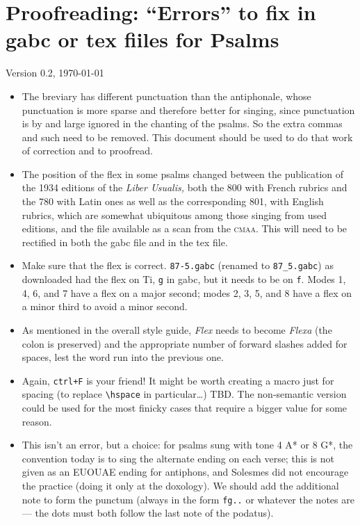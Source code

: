 \documentclass[11pt]{article}
\begin{document}
 \section{Proofreading: ``Errors'' to fix in gabc or tex fiiles for Psalms}
 
 {\centering Version 0.2, \today\par}
 
\begin{itemize}
 \item
The breviary has different punctuation than the antiphonale, whose punctuation is more sparse and therefore better for singing, since punctuation is by and large ignored in the chanting of the psalms. So the extra commas and such need to be removed. This document should be used to do that work of correction and to proofread.
 
 \item
 The position of the flex in some psalms changed between the publication of the 1934 editions of the \textit{Liber Usualis,} both the 800 with French rubrics and the 780 with Latin ones as well as the corresponding 801, with English rubrics, which are somewhat ubiquitous among those singing from used editions, and the file available as a scan from the \textsc{cmaa}. This will need to be rectified in both the gabc file and in the tex file.
 
 \item
 
 Make sure that the flex is correct. \verb|87-5.gabc| (renamed to \verb|87_5.gabc|) as downloaded had the flex on Ti, \verb|g| in gabc, but it needs to be on \verb|f|. Modes 1, 4, 6, and 7 have a flex on a major second; modes 2, 3, 5, and 8 have a flex on a minor third to avoid a minor second.

 \item
 As mentioned in the overall style guide, \textit{Flex} needs to become \textit{Flexa} (the colon is preserved) and the appropriate number of forward slashes added for spaces, lest the word run into the previous one. 

 \item
 Again, \texttt{ctrl+F} is your friend! It might be worth creating a macro just for spacing (to replace \verb|\hspace| in particular…) TBD. The non-semantic version could be used for the most finicky cases that require a bigger value for some reason.

 \item
 This isn't an error, but a choice: for psalms sung with tone 4 A* or 8 G*, the convention today is to sing the alternate ending on each verse; this is not given as an EUOUAE ending for antiphons, and Solesmes did not encourage the practice (doing it only at the doxology). We should add the additional note to form the punctum (always in the form \texttt{fg..} or whatever the notes are — the dots must both follow the last note of the podatus).


\end{itemize}
\end{document}
